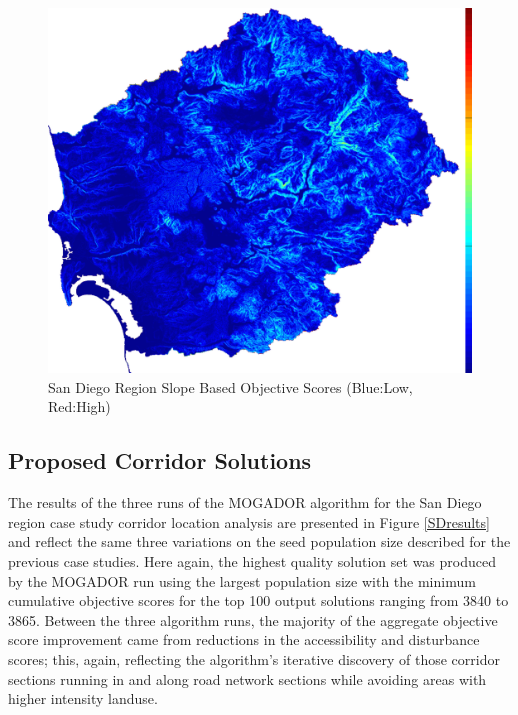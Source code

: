         \begin{figure}[!h]
            \begin{center}
            \includegraphics[width=5.5in]{figures/SanDiego_SlopeScore.png}   
            \caption{San Diego Region Slope Based Objective Scores (Blue:Low, Red:High)}
            \label{fig:SDslope}
            \end{center}
        \end{figure}
        
    \subsection{Proposed Corridor Solutions}

The results of the three runs of the MOGADOR algorithm for the San Diego region case study corridor location analysis are presented in Figure \ref{SDresults} and reflect the same three variations on the seed population size described for the previous case studies. Here again, the highest quality solution set was produced by the MOGADOR run using the largest population size with the minimum cumulative objective scores for the top 100 output solutions ranging from 3840 to 3865. Between the three algorithm runs, the majority of the aggregate objective score improvement came from reductions in the accessibility and disturbance scores; this, again, reflecting the algorithm's iterative discovery of those corridor sections running in and along road network sections while avoiding areas with higher intensity landuse.

